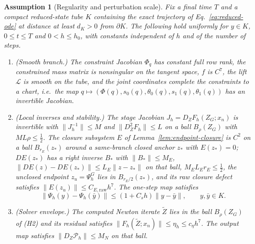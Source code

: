 \documentclass[preprint,12pt]{elsarticle}
\newtheorem{assumption}{Assumption}
\begin{document}
\begin{assumption}[Regularity and perturbation scale]
\label{ass:regularity}
Fix a final time $T$ and a compact reduced-state tube $K$ containing the exact trajectory of
Eq.~\eqref{eq:reduced-ode} at distance at least $d_K>0$ from $\partial K$. The following hold
uniformly for $y\in K$, $0\le t\le T$ and $0<h\le h_0$, with constants independent of $h$ and of
the number of steps.
\begin{enumerate}
  \item[(H1)] (Smooth branch.) The constraint Jacobian $\Phi_q$ has constant full row rank, the
  constrained mass matrix is nonsingular on the tangent space, $f$ is $C^7$, the lift $\mathcal L$
  is smooth on the tube, and the joint coordinates complete the constraints to a chart, i.e.\ the
  map $q\mapsto(\Phi(q),s_0(q),\theta_0(q),s_1(q),\theta_1(q))$ has an invertible Jacobian.
  \item[(H2)] (Local inverses and stability.) The stage Jacobian $J_h=D_ZF_h(Z_G;x_n)$ is
  invertible with $\|J_h^{-1}\|\le M$ and $\|D_Z^2F_h\|\le L$ on a ball $B_\rho(Z_G)$ with
  $ML\rho\le\tfrac12$. The closure subsystem $E$ of Lemma~\ref{lem:endpoint-closure} is $C^2$ on a
  ball $B_{r_E}(z_\ast)$ around a same-branch closed anchor $z_\ast$ with $E(z_\ast)=0$;
  $DE(z_\ast)$ has a right inverse $B_\ast$ with $\|B_\ast\|\le M_{E}$,
  $\|DE(z)-DE(z_\ast)\|\le L_E\|z-z_\ast\|$ on that ball, $M_{E}L_Er_E\le\tfrac12$, the unclosed
  endpoint $z_u=\Psi_h^G$ lies in $B_{r_E/2}(z_\ast)$, and its raw closure defect satisfies
  $\|E(z_u)\|\le C_{E,\mathrm{raw}}h^7$. The one-step map satisfies
  \begin{equation}
  \label{eq:assumption-stability-scale}
    \|\Psi_h(y)-\Psi_h(\bar y)\|\le (1+C_sh)\|y-\bar y\|,\qquad y,\bar y\in K .
  \end{equation}
  \item[(H3)] (Solver envelope.) The computed Newton iterate $\widetilde Z$ lies in the ball
  $B_\rho(Z_G)$ of (H2) and its residual satisfies $\|F_h(\widetilde Z;x_n)\|\le\eta_h\le c_\eta h^7$.
  The output map satisfies $\|D_Z\mathcal P_h\|\le M_N$ on that ball.
\end{enumerate}
\end{assumption}
\end{document}
